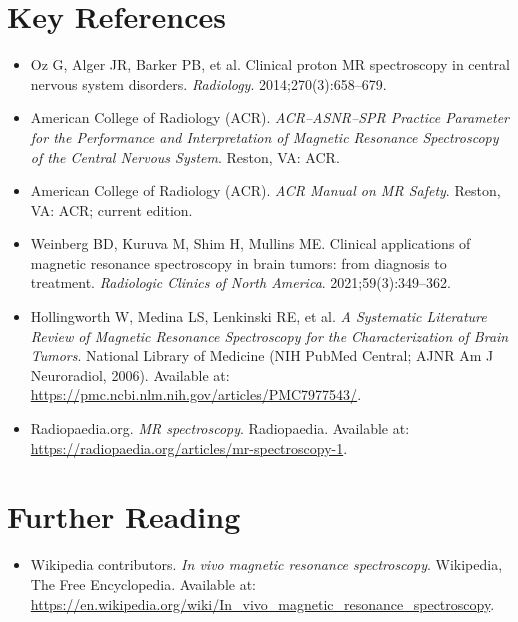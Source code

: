 \section{Key References}
\begin{itemize}
\item Oz G, Alger JR, Barker PB, et al. Clinical proton MR spectroscopy in central nervous system disorders. \textit{Radiology}. 2014;270(3):658--679.
\item American College of Radiology (ACR). \textit{ACR--ASNR--SPR Practice Parameter for the Performance and Interpretation of Magnetic Resonance Spectroscopy of the Central Nervous System}. Reston, VA: ACR.
\item American College of Radiology (ACR). \textit{ACR Manual on MR Safety}. Reston, VA: ACR; current edition.
\item Weinberg BD, Kuruva M, Shim H, Mullins ME. Clinical applications of magnetic resonance spectroscopy in brain tumors: from diagnosis to treatment. \textit{Radiologic Clinics of North America}. 2021;59(3):349--362.
\item Hollingworth W, Medina LS, Lenkinski RE, et al. \textit{A Systematic Literature Review of Magnetic Resonance Spectroscopy for the Characterization of Brain Tumors}. National Library of Medicine (NIH PubMed Central; AJNR Am J Neuroradiol, 2006). Available at: \url{https://pmc.ncbi.nlm.nih.gov/articles/PMC7977543/}.
\item Radiopaedia.org. \textit{MR spectroscopy}. Radiopaedia. Available at: \url{https://radiopaedia.org/articles/mr-spectroscopy-1}.
\end{itemize}

\section{Further Reading}
\begin{itemize}
  \item Wikipedia contributors. \textit{In vivo magnetic resonance spectroscopy}. Wikipedia, The Free Encyclopedia. Available at: \url{https://en.wikipedia.org/wiki/In_vivo_magnetic_resonance_spectroscopy}.
\end{itemize}
